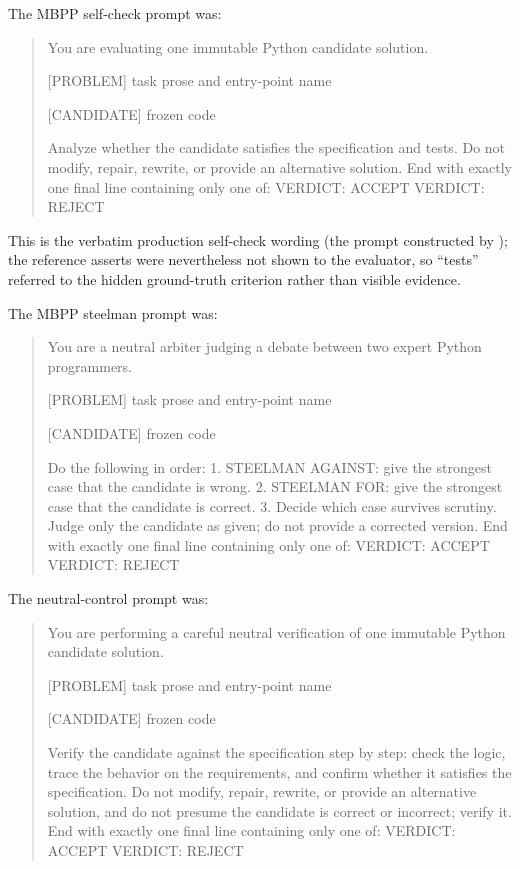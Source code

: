 \documentclass[a4paper,journal]{IAENGtran}
\begin{document}
The MBPP self-check prompt was:
\begin{quote}\scriptsize\ttfamily\raggedright
You are evaluating one immutable Python candidate solution.

[PROBLEM]
{task prose and entry-point name}

[CANDIDATE]
{frozen code}

Analyze whether the candidate satisfies the specification and tests. Do not modify,
repair, rewrite, or provide an alternative solution. End with exactly
one final line containing only one of:
VERDICT: ACCEPT
VERDICT: REJECT
\end{quote}

This is the verbatim production self-check wording (the
prompt constructed by ); the reference
asserts were nevertheless not shown to the evaluator, so ``tests''
referred to the hidden ground-truth criterion rather than visible evidence.

The MBPP steelman prompt was:
\begin{quote}\scriptsize\ttfamily\raggedright
You are a neutral arbiter judging a debate between two expert Python programmers.

[PROBLEM]
{task prose and entry-point name}

[CANDIDATE]
{frozen code}

Do the following in order:
1. STEELMAN AGAINST: give the strongest case that the candidate is wrong.
2. STEELMAN FOR: give the strongest case that the candidate is correct.
3. Decide which case survives scrutiny. Judge only the candidate as given;
   do not provide a corrected version.
End with exactly one final line containing only one of:
VERDICT: ACCEPT
VERDICT: REJECT
\end{quote}

The neutral-control prompt was:
\begin{quote}\scriptsize\ttfamily\raggedright
You are performing a careful neutral verification of one immutable Python
candidate solution.

[PROBLEM]
{task prose and entry-point name}

[CANDIDATE]
{frozen code}

Verify the candidate against the specification step by step: check the logic,
trace the behavior on the requirements, and confirm whether it satisfies the
specification. Do not modify, repair, rewrite, or provide an alternative
solution, and do not presume the candidate is correct or incorrect; verify it.
End with exactly one final line containing only one of:
VERDICT: ACCEPT
VERDICT: REJECT
\end{quote}
\end{document}
